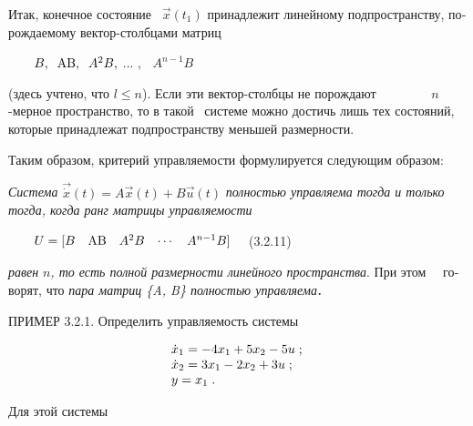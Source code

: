 \documentclass[a4paper]{article}
\newcommand\normalsubformula[1]{\text{\mathversion{normal}$#1$}}
\begin{document}
{\begin{russian}\sffamily
Итак, конечное состояние \  $\vec x(t_1)$ принадлежит линейному подпространству, порождаемому вектор-столбцами матриц
\end{russian}}

{\begin{russian}\sffamily
\ \ \ \  $B,\;\;\normalsubformula{\text{AB}},\;\;A^2B,$ ... , $\;\;A^{n-1}B$ 
\end{russian}}

{\begin{russian}\sffamily
(здесь учтено, что  $l\le n$). Если эти вектор-столбцы не порождают \ \ \ \ \ \ \ \  $n$-мерное пространство, то в такой
\ системе можно достичь лишь тех состояний, которые принадлежат подпространству меньшей размерности. 
\end{russian}}

{\begin{russian}\sffamily
Таким образом, критерий управляемости формулируется следующим образом: 
\end{russian}}

{\begin{russian}\sffamily
\textit{Система } $\vec{\dot x}\left(t\right)=A\vec x\left(t\right)+B\vec u\left(t\right)$\textit{ полностью управляема
тогда и только тогда, когда ранг матрицы управляемости}
\end{russian}}

{\begin{russian}\sffamily
\ \ \ \  $U=[\begin{matrix}B&\normalsubformula{\text{AB}}&A^2B&\cdots &A^{n-1}B\end{matrix}]\text{  }$\ \ (3.2.11)
\end{russian}}

{\begin{russian}\sffamily
\textit{равен } $n$\textit{, то есть полной размерности линейного пространства}. При этом \ \ говорят, что\textit{ пара
матриц \{A, B\} полностью управляема}\textbf{\textit{.}}
\end{russian}}


\bigskip

{\begin{russian}\sffamily
ПРИМЕР 3.2.1. Определить управляемость системы
\end{russian}}

\begin{equation*}
\begin{matrix}\dot x_1=-4x_1+5x_2-5u\;;\hfill\null \\\dot x_2=3x_1-2x_2+3u\;;\hfill\null \\y=x_1\;.\hfill\null
\end{matrix}\hfill 
\end{equation*}
{\begin{russian}\sffamily
Для этой системы 
\end{russian}}
\end{document}
